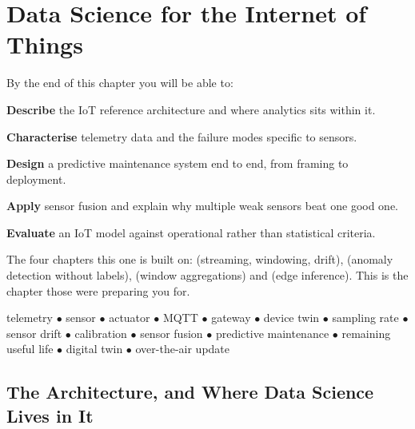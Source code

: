 \chapter{Data Science for the Internet of Things}\label{ch:iot}

\begin{outcomes}
By the end of this chapter you will be able to:
\begin{tight}
  \item \textbf{Describe} the IoT reference architecture and where analytics sits within it.
  \item \textbf{Characterise} telemetry data and the failure modes specific to sensors.
  \item \textbf{Design} a predictive maintenance system end to end, from framing to deployment.
  \item \textbf{Apply} sensor fusion and explain why multiple weak sensors beat one good one.
  \item \textbf{Evaluate} an IoT model against operational rather than statistical criteria.
\end{tight}
\end{outcomes}

\begin{prereq}
The four chapters this one is built on:  (streaming, windowing,
drift),  (anomaly detection without labels), 
(window aggregations) and  (edge inference). This is the chapter
those were preparing you for.
\end{prereq}

\begin{keyterms}
telemetry $\bullet$ sensor $\bullet$ actuator $\bullet$ MQTT $\bullet$ gateway
$\bullet$ device twin $\bullet$ sampling rate $\bullet$ sensor drift $\bullet$
calibration $\bullet$ sensor fusion $\bullet$ predictive maintenance $\bullet$
remaining useful life $\bullet$ digital twin $\bullet$ over-the-air update
\end{keyterms}

\section{The Architecture, and Where Data Science Lives in It}

